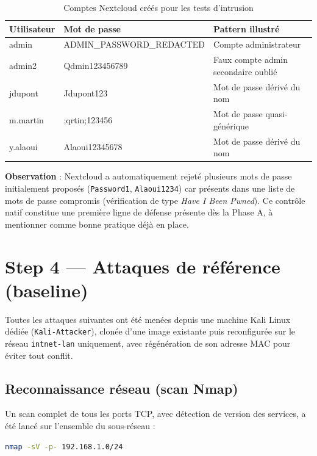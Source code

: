\begin{table}[h]
\centering
\begin{tabular}{|l|l|l|}
\hline
\textbf{Utilisateur} & \textbf{Mot de passe} & \textbf{Pattern illustré} \\
\hline
admin & ADMIN_PASSWORD_REDACTED & Compte administrateur \\
admin2 & Qdmin123456789 & Faux compte admin secondaire oublié \\
jdupont & Jdupont123 & Mot de passe dérivé du nom \\
m.martin & ;qrtin;123456 & Mot de passe quasi-générique \\
y.alaoui & Alaoui12345678 & Mot de passe dérivé du nom \\
\hline
\end{tabular}
\caption{Comptes Nextcloud créés pour les tests d'intrusion}
\label{tab:comptes-nextcloud}
\end{table}

\textbf{Observation} : Nextcloud a automatiquement rejeté plusieurs mots
de passe initialement proposés (\texttt{Password1},
\texttt{Alaoui1234}) car présents dans une liste de mots de passe
compromis (vérification de type \emph{Have I Been Pwned}). Ce contrôle
natif constitue une première ligne de défense présente dès la Phase A,
à mentionner comme bonne pratique déjà en place.

\section{Step 4 --- Attaques de référence (baseline)}

Toutes les attaques suivantes ont été menées depuis une machine Kali
Linux dédiée (\texttt{Kali-Attacker}), clonée d'une image existante puis
reconfigurée sur le réseau \texttt{intnet-lan} uniquement, avec
régénération de son adresse MAC pour éviter tout conflit.

\subsection{Reconnaissance réseau (scan Nmap)}
\label{sec:nmap}

Un scan complet de tous les ports TCP, avec détection de version des
services, a été lancé sur l'ensemble du sous-réseau :

\begin{lstlisting}[language=bash, caption={Scan de reconnaissance Nmap}]
nmap -sV -p- 192.168.1.0/24
\end{lstlisting}

